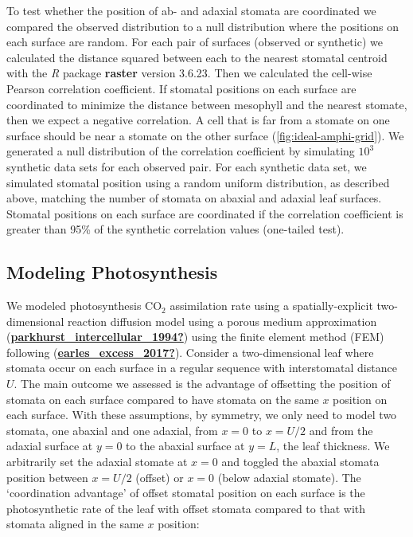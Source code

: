 \documentclass[12pt,halfline,a4paper,]{ouparticle}
\begin{document}
To test whether the position of ab- and adaxial stomata are coordinated
we compared the observed distribution to a null distribution where the
positions on each surface are random. For each pair of surfaces
(observed or synthetic) we calculated the distance squared between each
to the nearest stomatal centroid with the \emph{R} package
\textbf{raster} version 3.6.23. Then we calculated the cell-wise Pearson
correlation coefficient. If stomatal positions on each surface are
coordinated to minimize the distance between mesophyll and the nearest
stomate, then we expect a negative correlation. A cell that is far from
a stomate on one surface should be near a stomate on the other surface
(\autoref{fig:ideal-amphi-grid}). We generated a null distribution of
the correlation coefficient by simulating \(10^3\) synthetic data sets
for each observed pair. For each synthetic data set, we simulated
stomatal position using a random uniform distribution, as described
above, matching the number of stomata on abaxial and adaxial leaf
surfaces. Stomatal positions on each surface are coordinated if the
correlation coefficient is greater than 95\% of the synthetic
correlation values (one-tailed test).

\hypertarget{modeling-photosynthesis}{%
\subsection{Modeling Photosynthesis}\label{modeling-photosynthesis}}

We modeled photosynthesis CO\(_2\) assimilation rate using a
spatially-explicit two-dimensional reaction diffusion model using a
porous medium approximation
(\protect\hyperlink{ref-parkhurst_intercellular_1994}{\textbf{parkhurst\_intercellular\_1994?}})
using the finite element method (FEM) following
(\protect\hyperlink{ref-earles_excess_2017}{\textbf{earles\_excess\_2017?}}).
Consider a two-dimensional leaf where stomata occur on each surface in a
regular sequence with interstomatal distance \(U\). The main outcome we
assessed is the advantage of offsetting the position of stomata on each
surface compared to have stomata on the same \(x\) position on each
surface. With these assumptions, by symmetry, we only need to model two
stomata, one abaxial and one adaxial, from \(x = 0\) to \(x = U/2\) and
from the adaxial surface at \(y = 0\) to the abaxial surface at
\(y = L\), the leaf thickness. We arbitrarily set the adaxial stomate at
\(x = 0\) and toggled the abaxial stomata position between \(x = U/2\)
(offset) or \(x = 0\) (below adaxial stomate). The `coordination
advantage' of offset stomatal position on each surface is the
photosynthetic rate of the leaf with offset stomata compared to that
with stomata aligned in the same \(x\) position:
\end{document}
